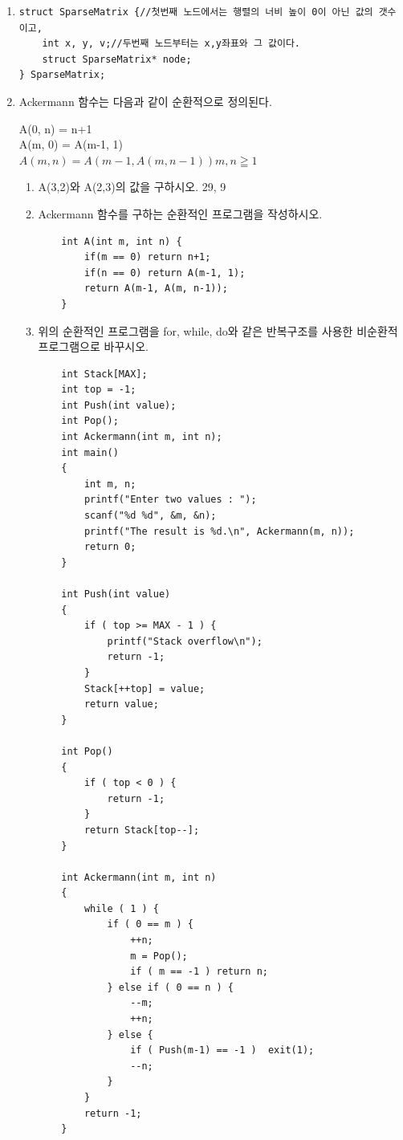\documentclass[11pt,a4paper]{article}
\begin{document}
\begin{enumerate}
\begin{lstlisting}
int nCr(int n, int r)
{
	if(r==0 || r==n) return 1;
	return nCr(n-1, r-1) + nCr(n-1, r);
}

//반복함수
int factorial(int n) {
	int r = 1;
	for(int i=1; i<=n; i++) r *= i;
	return r;
}
int nPr(int n, int r) {
	return factorial(n)/factorial(r);
}
int nCr(int n, int r)
{
	return nPr(n, r)/factorial(r);
}
\end{lstlisting}
\item 
\begin{lstlisting}
struct SparseMatrix {//첫번째 노드에서는 행렬의 너비 높이 0이 아닌 값의 갯수이고, 
	int x, y, v;//두번째 노드부터는 x,y좌표와 그 값이다.
	struct SparseMatrix* node;
} SparseMatrix;
\end{lstlisting}
\item Ackermann 함수는 다음과 같이 순환적으로 정의된다.

A(0, n) = n+1\\
A(m, 0) = A(m-1, 1)\\
$ A(m, n) = A(m-1, A(m, n-1)) m,n\geqq 1 $

\begin{enumerate}
	\item A(3,2)와 A(2,3)의 값을 구하시오. 29, 9
	\item Ackermann 함수를 구하는 순환적인 프로그램을 작성하시오.
	\begin{lstlisting}
	int A(int m, int n) {
		if(m == 0) return n+1;
		if(n == 0) return A(m-1, 1);
		return A(m-1, A(m, n-1));
	}
	\end{lstlisting}
	
	\item 위의 순환적인 프로그램을 for, while, do와 같은 반복구조를 사용한 비순환적 프로그램으로 바꾸시오.
	\begin{lstlisting}
	int Stack[MAX];
	int top = -1;
	int Push(int value);
	int Pop();
	int Ackermann(int m, int n);
	int main()
	{
		int m, n;
		printf("Enter two values : ");
		scanf("%d %d", &m, &n);
		printf("The result is %d.\n", Ackermann(m, n));
		return 0;
	}
	
	int Push(int value)
	{
		if ( top >= MAX - 1 ) {
			printf("Stack overflow\n");
			return -1;
		}
		Stack[++top] = value;
		return value;
	}
	
	int Pop()
	{
		if ( top < 0 ) {
			return -1;
		}
		return Stack[top--];
	}
	
	int Ackermann(int m, int n)
	{
		while ( 1 ) {
			if ( 0 == m ) {
				++n;
				m = Pop();
				if ( m == -1 ) return n;
			} else if ( 0 == n ) {
				--m;
				++n;
			} else {
				if ( Push(m-1) == -1 )	exit(1);
				--n;
			}
		}
		return -1;
	}
	

\end{lstlisting}
\end{enumerate}
\end{enumerate}
\end{document}
